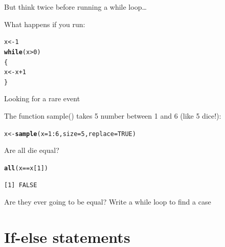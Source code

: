 \documentclass[10pt]{beamer}\usepackage[]{graphicx}\usepackage[]{color}
\makeatletter
\newcommand{\hlnum}[1]{\textcolor[rgb]{0.686,0.059,0.569}{#1}}%
\newcommand{\hlopt}[1]{\textcolor[rgb]{0,0,0}{#1}}%
\newcommand{\hlstd}[1]{\textcolor[rgb]{0.345,0.345,0.345}{#1}}%
\newcommand{\hlkwa}[1]{\textcolor[rgb]{0.161,0.373,0.58}{\textbf{#1}}}%
\newcommand{\hlkwb}[1]{\textcolor[rgb]{0.69,0.353,0.396}{#1}}%
\newcommand{\hlkwc}[1]{\textcolor[rgb]{0.333,0.667,0.333}{#1}}%
\newcommand{\hlkwd}[1]{\textcolor[rgb]{0.737,0.353,0.396}{\textbf{#1}}}%
\newenvironment{kframe}{%
 \def\at@end@of@kframe{}%
 \ifinner\ifhmode%
  \def\at@end@of@kframe{\end{minipage}}%
  \begin{minipage}{\columnwidth}%
 \fi\fi%
 \def\FrameCommand##1{\hskip\@totalleftmargin \hskip-\fboxsep
 \colorbox{shadecolor}{##1}\hskip-\fboxsep
     \hskip-\linewidth \hskip-\@totalleftmargin \hskip\columnwidth}%
 \MakeFramed {\advance\hsize-\width
   \@totalleftmargin\z@ \linewidth\hsize
   \@setminipage}}%
 {\par\unskip\endMakeFramed%
 \at@end@of@kframe}
\newenvironment{knitrout}{}{} %
\makeatother
\begin{document}
\begin{frame}[fragile]{But think twice before running a while loop\dots}
  
What happens if you run:
\begin{knitrout}
\color{fgcolor}\begin{kframe}
\begin{alltt}
\hlstd{x} \hlkwb{<-} \hlnum{1}
\hlkwa{while}\hlstd{(x}\hlopt{>}\hlnum{0}\hlstd{)}
\hlstd{\{}
  \hlstd{x} \hlkwb{<-} \hlstd{x} \hlopt{+} \hlnum{1}
\hlstd{\}}
\end{alltt}
\end{kframe}
\end{knitrout}

\end{frame}

\begin{frame}[fragile]{Looking for a rare event}

The function sample() takes 5 number between 1 and 6 (like 5 dice!):
\begin{knitrout}
\color{fgcolor}\begin{kframe}
\begin{alltt}
\hlstd{x} \hlkwb{<-} \hlkwd{sample}\hlstd{(}\hlkwc{x} \hlstd{=} \hlnum{1}\hlopt{:}\hlnum{6}\hlstd{,} \hlkwc{size} \hlstd{=} \hlnum{5}\hlstd{,} \hlkwc{replace} \hlstd{=} \hlnum{TRUE}\hlstd{)}
\end{alltt}
\end{kframe}
\end{knitrout}

Are all die equal?
\begin{knitrout}
\color{fgcolor}\begin{kframe}
\begin{alltt}
\hlkwd{all}\hlstd{(x} \hlopt{==} \hlstd{x[}\hlnum{1}\hlstd{])}
\end{alltt}
\begin{verbatim}
[1] FALSE
\end{verbatim}
\end{kframe}
\end{knitrout}

Are they ever going to be equal?
Write a while loop to find a case


\end{frame}

\section{If-else statements}
\end{document}
